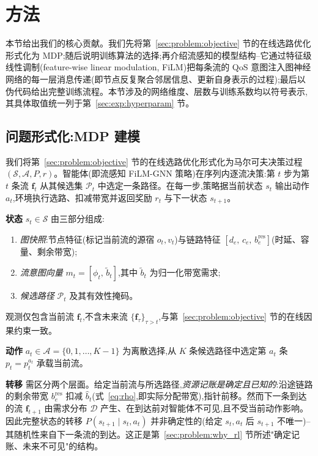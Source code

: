 \section{方法}
\label{sec:method}

本节给出我们的核心贡献。我们先将第~\ref{sec:problem:objective} 节的在线选路优化形式化为 MDP;随后说明训练算法的选择;再介绍流感知的模型结构--它通过特征级线性调制(feature-wise linear modulation, FiLM)把每条流的 QoS 意图注入图神经网络的每一层消息传递(即节点反复聚合邻居信息、更新自身表示的过程);最后以伪代码给出完整训练流程。本节涉及的网络维度、层数与训练系数均以符号表示,其具体取值统一列于第~\ref{sec:exp:hyperparam} 节。

\subsection{问题形式化:MDP 建模}
\label{sec:method:mdp}

我们将第~\ref{sec:problem:objective} 节的在线选路优化形式化为马尔可夫决策过程 $(\mathcal{S},\mathcal{A},P,r)$。智能体(即流感知 FiLM-GNN 策略)在序列内逐流决策:第 $t$ 步为第 $t$ 条流 $\mathbf{f}_t$ 从其候选集 $\mathcal{P}_t$ 中选定一条路径。在每一步,策略据当前状态 $s_t$ 输出动作 $a_t$,环境执行选路、扣减带宽并返回奖励 $r_t$ 与下一状态 $s_{t+1}$。

\textbf{状态} $s_t\in\mathcal{S}$ 由三部分组成:
\begin{enumerate}
\item \emph{图快照}:节点特征(标记当前流的源宿 $o_t,v_t$)与链路特征 $[d_e,\,c_e,\,b_e^{\text{res}}]$(时延、容量、剩余带宽);
\item \emph{流意图向量} $m_t=[\phi_t,\,\tilde b_t]$,其中 $\tilde b_t$ 为归一化带宽需求;
\item \emph{候选路径} $\mathcal{P}_t$ 及其有效性掩码。
\end{enumerate}
观测仅包含当前流 $\mathbf{f}_t$,不含未来流 $\{\mathbf{f}_\tau\}_{\tau>t}$,与第~\ref{sec:problem:objective} 节的在线因果约束一致。

\textbf{动作} $a_t\in\mathcal{A}=\{0,1,\dots,K-1\}$ 为离散选择,从 $K$ 条候选路径中选定第 $a_t$ 条 $p_t=p_t^{a_t}$ 承载当前流。

\textbf{转移} 需区分两个层面。给定当前流与所选路径,\emph{资源记账是确定且已知的}:沿途链路的剩余带宽 $b_e^{\text{res}}$ 扣减 $\hat b_t$(式~\eqref{eq:rho},即实际分配带宽),指针前移。然而下一条到达的流 $\mathbf{f}_{t+1}$ 由需求分布 $\mathcal{D}$ 产生、在到达前对智能体不可见,且不受当前动作影响。因此完整状态的转移 $P(s_{t+1}\mid s_t,a_t)$ 并非确定性的(给定 $s_t,a_t$ 后 $s_{t+1}$ 不唯一)--其随机性来自下一条流的到达。这正是第~\ref{sec:problem:why_rl} 节所述"确定记账、未来不可见"的结构。

